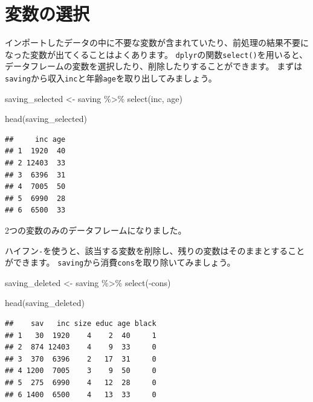\documentclass[
]{book}
\newenvironment{Shaded}{\begin{snugshade}}{\end{snugshade}}
\newcommand{\FunctionTok}[1]{\textcolor[rgb]{0.00,0.00,0.00}{#1}}
\newcommand{\NormalTok}[1]{#1}
\newcommand{\OtherTok}[1]{\textcolor[rgb]{0.56,0.35,0.01}{#1}}
\newcommand{\SpecialCharTok}[1]{\textcolor[rgb]{0.00,0.00,0.00}{#1}}
\begin{document}
\hypertarget{ux5909ux6570ux306eux9078ux629e}{%
\section{変数の選択}\label{ux5909ux6570ux306eux9078ux629e}}

インポートしたデータの中に不要な変数が含まれていたり、前処理の結果不要になった変数が出てくることはよくあります。
\texttt{dplyr}の関数\texttt{select()}を用いると、データフレームの変数を選択したり、削除したりすることができます。
まずは\texttt{saving}から収入\texttt{inc}と年齢\texttt{age}を取り出してみましょう。

\begin{Shaded}
\begin{Highlighting}[]
\NormalTok{saving\_selected }\OtherTok{\textless{}{-}}
\NormalTok{  saving }\SpecialCharTok{\%\textgreater{}\%}
    \FunctionTok{select}\NormalTok{(inc, age)}

\FunctionTok{head}\NormalTok{(saving\_selected)}
\end{Highlighting}
\end{Shaded}

\begin{verbatim}
##     inc age
## 1  1920  40
## 2 12403  33
## 3  6396  31
## 4  7005  50
## 5  6990  28
## 6  6500  33
\end{verbatim}

2つの変数のみのデータフレームになりました。

ハイフン\texttt{-}を使うと、該当する変数を削除し、残りの変数はそのままとすることができます。
\texttt{saving}から消費\texttt{cons}を取り除いてみましょう。

\begin{Shaded}
\begin{Highlighting}[]
\NormalTok{saving\_deleted }\OtherTok{\textless{}{-}}
\NormalTok{  saving }\SpecialCharTok{\%\textgreater{}\%}
    \FunctionTok{select}\NormalTok{(}\SpecialCharTok{{-}}\NormalTok{cons)}

\FunctionTok{head}\NormalTok{(saving\_deleted)}
\end{Highlighting}
\end{Shaded}

\begin{verbatim}
##    sav   inc size educ age black
## 1   30  1920    4    2  40     1
## 2  874 12403    4    9  33     0
## 3  370  6396    2   17  31     0
## 4 1200  7005    3    9  50     0
## 5  275  6990    4   12  28     0
## 6 1400  6500    4   13  33     0
\end{verbatim}
\end{document}
